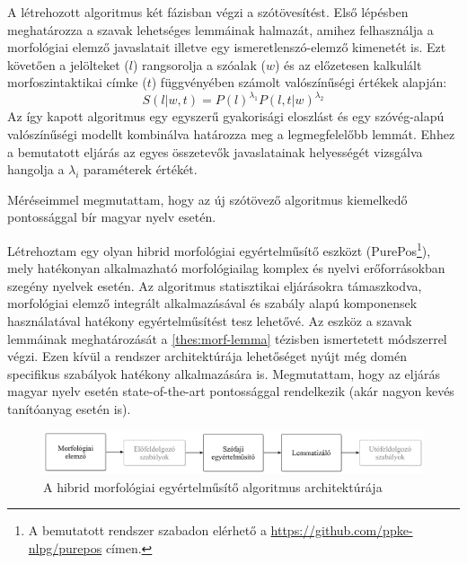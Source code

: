 A létrehozott algoritmus két fázisban végzi a szótövesítést. 
Első lépésben meghatározza a szavak lehetséges lemmáinak halmazát, amihez felhasználja a morfológiai elemző javaslatait illetve egy ismeretlenszó-elemző kimenetét is. 
Ezt követően a jelölteket ($l$)  rangsorolja a szóalak ($w$) és az előzetesen kalkulált morfoszintaktikai címke ($t$) függvényében számolt valószínűségi értékek alapján:
\begin{equation}\label{lemma-interpolated}
S(l|w,t) = P(l)^{\lambda_1} P(l,t|w)^{\lambda_2}
\end{equation}
Az így kapott algoritmus egy egyszerű gyakorisági eloszlást és egy szóvég-alapú valószínűségi modellt kombinálva határozza meg a legmegfelelőbb lemmát.
Ehhez a bemutatott eljárás az egyes összetevők javaslatainak helyességét vizsgálva hangolja a  $\lambda_i$ paraméterek értékét.

Méréseimmel megmutattam, hogy az új szótövező algoritmus kiemelkedő pontossággal bír magyar nyelv esetén. 

\thesisline%


\begin{core}
\begin{thesis}\label{thes:morf-tagging}
Létrehoztam egy olyan hibrid morfológiai egyértelműsítő eszközt (PurePos\footnote{A bemutatott rendszer szabadon elérhető a \href{https://github.com/ppke-nlpg/purepos}{https://github.com/ppke-nlpg/purepos} címen.}), mely hatékonyan alkalmazható  morfológiailag komplex és nyelvi erőforrásokban szegény nyelvek esetén. 
Az algoritmus statisztikai eljárásokra támaszkodva, morfológiai elemző integrált alkalmazásával és szabály alapú komponensek használatával hatékony egyértelműsítést tesz lehetővé. 
Az eszköz a szavak lemmáinak meghatározását a \ref{thes:morf-lemma} tézisben ismertetett módszerrel végzi.
Ezen kívül a rendszer architektúrája lehetőséget nyújt még domén specifikus szabályok hatékony alkalmazására is.
Megmutattam, hogy az eljárás magyar nyelv esetén state-of-the-art pontossággal rendelkezik (akár nagyon kevés tanítóanyag esetén is).
\end{thesis}

\begin{pub}
\cite{Orosz2011,Orosz2012,Orosz2012a,Orosz2013a}
\end{pub}
\end{core}

\begin{figure}[H] 
  \centering
  \includegraphics[width=1\textwidth]{MorphTagging/architecture_hu.png} 
  \caption{A hibrid morfológiai egyértelműsítő algoritmus architektúrája}
  \label{fig:purepos-arch_hu}
\end{figure}

